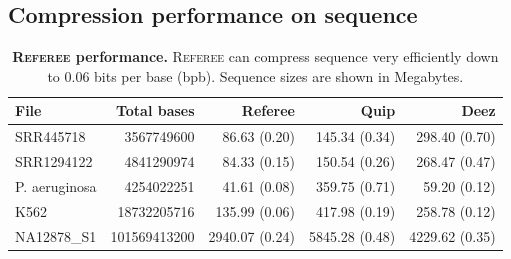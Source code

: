\documentclass[12pt]{cmuthesis}
\newcommand{\refer}{\textsc{Referee}\xspace}
\begin{document}


  \subsection{Compression performance on sequence}




  \begin{table}[ht!]
    \caption{\textbf{\refer performance.} \refer can compress sequence very efficiently down to 0.06 bits per base (bpb). Sequence sizes are shown in Megabytes.}
    \label{tab:seq-compression}
    \centering
    \begin{tabular}{l r r r r}
    \toprule
    File & Total bases &  Referee & Quip & Deez \\
    \midrule
    SRR445718 & 3567749600 & 86.63 (0.20) & 145.34 (0.34) & 298.40 (0.70) \\
    SRR1294122 & 4841290974 & 84.33 (0.15) & 150.54 (0.26) & 268.47 (0.47) \\
    P. aeruginosa & 4254022251 & 41.61 (0.08) & 359.75 (0.71) & 59.20 (0.12) \\
    K562 & 18732205716 & 135.99 (0.06) & 417.98 (0.19) & 258.78 (0.12) \\
    NA12878\_S1 & 101569413200 & 2940.07 (0.24) & 5845.28 (0.48) & 4229.62 (0.35) \\
    \bottomrule
    \end{tabular}
  \end{table}
\end{document}
